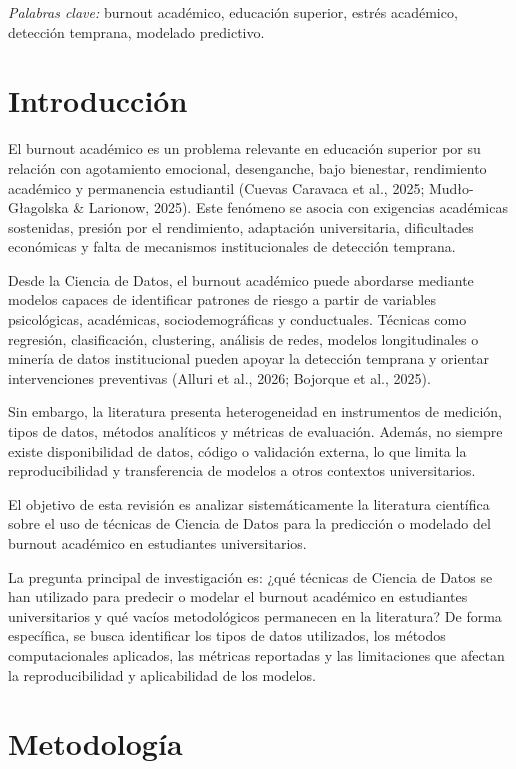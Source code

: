 \documentclass[12pt,a4paper]{article}
\begin{document}
\noindent\textit{Palabras clave:} burnout académico, educación superior, estrés académico, detección temprana, modelado predictivo.

\section{Introducción}

El burnout académico es un problema relevante en educación superior por su relación con agotamiento emocional, desenganche, bajo bienestar, rendimiento académico y permanencia estudiantil (Cuevas Caravaca et al., 2025; Mud\l{}o-G\l{}agolska \& Larionow, 2025). Este fenómeno se asocia con exigencias académicas sostenidas, presión por el rendimiento, adaptación universitaria, dificultades económicas y falta de mecanismos institucionales de detección temprana.

Desde la Ciencia de Datos, el burnout académico puede abordarse mediante modelos capaces de identificar patrones de riesgo a partir de variables psicológicas, académicas, sociodemográficas y conductuales. Técnicas como regresión, clasificación, clustering, análisis de redes, modelos longitudinales o minería de datos institucional pueden apoyar la detección temprana y orientar intervenciones preventivas (Alluri et al., 2026; Bojorque et al., 2025).

Sin embargo, la literatura presenta heterogeneidad en instrumentos de medición, tipos de datos, métodos analíticos y métricas de evaluación. Además, no siempre existe disponibilidad de datos, código o validación externa, lo que limita la reproducibilidad y transferencia de modelos a otros contextos universitarios.

El objetivo de esta revisión es analizar sistemáticamente la literatura científica sobre el uso de técnicas de Ciencia de Datos para la predicción o modelado del burnout académico en estudiantes universitarios.

La pregunta principal de investigación es: ¿qué técnicas de Ciencia de Datos se han utilizado para predecir o modelar el burnout académico en estudiantes universitarios y qué vacíos metodológicos permanecen en la literatura? De forma específica, se busca identificar los tipos de datos utilizados, los métodos computacionales aplicados, las métricas reportadas y las limitaciones que afectan la reproducibilidad y aplicabilidad de los modelos.

\section{Metodología}
\end{document}
